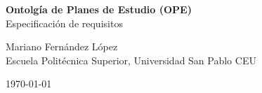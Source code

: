 \begin{titlepage}

\vspace*{\fill}
\begin{center}

    {\huge \textbf{Ontolgía de Planes de Estudio (OPE)}}
    \\{\LARGE Especificación de requisitos}
\vspace{3cm}

{\Large Mariano Fern\'andez L\'opez\\}
{\Large Escuela Polit\'ecnica Superior, Universidad San Pablo CEU\\}

{\Large \today}
\end{center}

\vspace*{\fill}

\end{titlepage}
\setcounter{page}{1}
